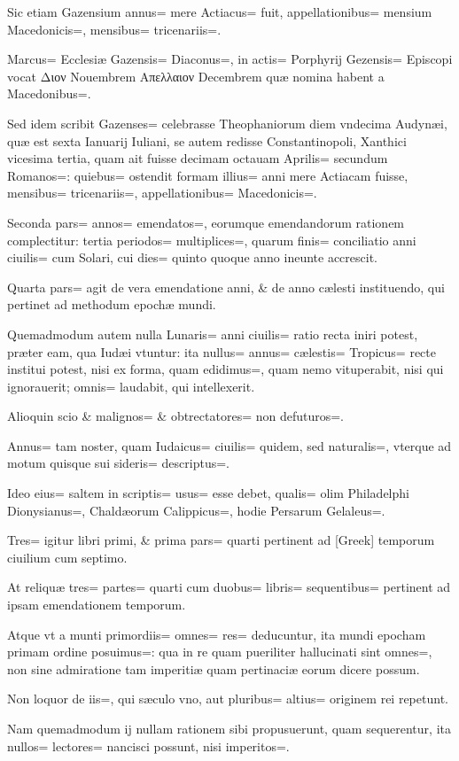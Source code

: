 \begin{parnumbers}
Sic etiam Gazensium annus= mere Actiacus= fuit, appellationibus= mensium Macedonicis=, mensibus= tricenariis=. 

Marcus= Ecclesiæ Gazensis= Diaconus=, in actis= Porphyrij Gezensis= Episcopi vocat Διον Nouembrem Απελλαιον Decembrem quæ nomina habent a Macedonibus=. 

Sed idem scribit Gazenses= celebrasse Theophaniorum diem vndecima Audynæi, quæ est sexta Ianuarij Iuliani, se autem redisse Constantinopoli, Xanthici vicesima tertia, quam ait fuisse decimam octauam Aprilis= secundum Romanos=: quiebus= ostendit formam illius= anni mere Actiacam fuisse, mensibus= tricenariis=, appellationibus= Macedonicis=. 

Seconda pars= annos= emendatos=, eorumque emendandorum
rationem complectitur: tertia periodos= multiplices=, quarum finis= conciliatio anni ciuilis= cum Solari, cui dies= quinto quoque anno ineunte accrescit.

Quarta pars= agit de vera emendatione anni, \& de anno cælesti instituendo, qui pertinet ad methodum epochæ mundi.

Quemadmodum autem nulla Lunaris= anni ciuilis= ratio recta iniri potest, præter eam, qua Iudæi vtuntur: ita nullus= annus= cælestis= Tropicus= recte institui potest, nisi ex forma, quam edidimus=, quam nemo vituperabit, nisi qui ignorauerit; omnis= laudabit, qui intellexerit.

Alioquin scio \& malignos= \& obtrectatores= non defuturos=. 

Annus= tam noster, quam Iudaicus= ciuilis= quidem, sed naturalis=, vterque ad motum quisque sui sideris= descriptus=. 

Ideo eius= saltem in scriptis= usus= esse debet, qualis= olim Philadelphi Dionysianus=, Chaldæorum Calippicus=, hodie Persarum Gelaleus=. 

Tres= igitur libri primi, \& prima pars= quarti pertinent ad [Greek] temporum ciuilium cum septimo.

At reliquæ tres= partes= quarti cum duobus= libris= sequentibus= pertinent ad ipsam emendationem temporum.

Atque vt a munti primordiis= omnes= res= deducuntur, ita mundi epocham primam ordine posuimus=: qua in re quam pueriliter hallucinati sint omnes=, non sine admiratione tam imperitiæ quam pertinaciæ eorum dicere possum.

Non loquor de iis=, qui sæculo vno, aut pluribus= altius= originem rei repetunt.

Nam quemadmodum ij nullam rationem sibi propusuerunt, quam sequerentur, ita nullos= lectores= nancisci possunt, nisi imperitos=. 


\end{parnumbers}
